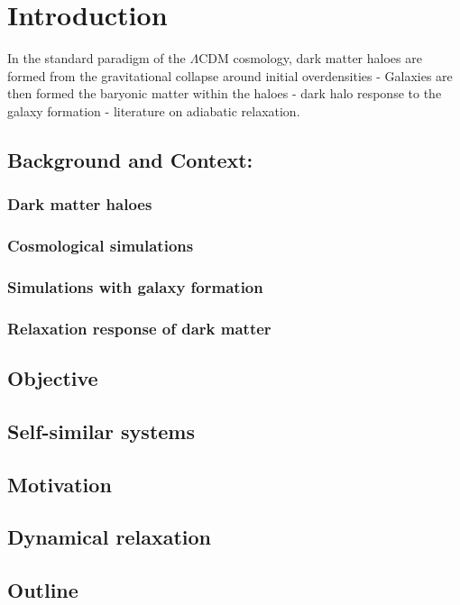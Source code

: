 \chapter{Introduction}
\label{chap:intro}
In the standard paradigm of the $\Lambda$CDM cosmology, dark matter haloes are formed from the gravitational collapse around initial overdensities - Galaxies are then formed the baryonic matter within the haloes - dark halo response to the galaxy formation - literature on adiabatic relaxation.

\section{Background and Context:}
\subsection{Dark matter haloes}

\subsection{Cosmological simulations}

\subsection{Simulations with galaxy formation}

\subsection{Relaxation response of dark matter}

\section{Objective}


\section{Self-similar systems}
\cite{2015LauNagaietal}

\section{Motivation}

\section{Dynamical relaxation}

\section{Outline}
